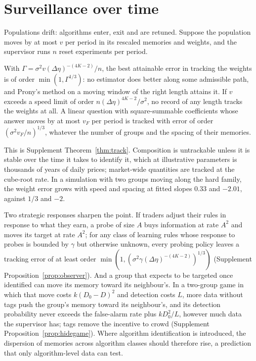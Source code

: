 \section{Surveillance over time}\label{n:dyn}

Populations drift: algorithms enter, exit and are retuned. Suppose the population moves by at most $v$ per period in its rescaled memories and weights, and the supervisor runs $n$ reset experiments per period.

\begin{theorem}\label{n:track}
With $\Gamma=\sigma^2v(\Delta\eta)^{-(4K-2)}/n$, the best attainable error in tracking the weights is of order $\min(1,\Gamma^{1/3})$: no estimator does better along some admissible path, and Prony's method on a moving window of the right length attains it. If $v$ exceeds a speed limit of order $n(\Delta\eta)^{4K-2}/\sigma^2$, no record of any length tracks the weights at all. A linear question with square-summable coefficients whose answer moves by at most $v_F$ per period is tracked with error of order $(\sigma^2v_F/n)^{1/3}$, whatever the number of groups and the spacing of their memories.
\end{theorem}

This is Supplement Theorem~\ref{thm:track}. Composition is untrackable unless it is stable over the time it takes to identify it, which at illustrative parameters is thousands of years of daily prices; market-wide quantities are tracked at the cube-root rate. In a simulation with two groups moving along the hard family, the weight error grows with speed and spacing at fitted slopes $0.33$ and $-2.01$, against $1/3$ and $-2$.

Two strategic responses sharpen the point. If traders adjust their rules in response to what they earn, a probe of size $A$ buys information at rate $A^2$ and moves its target at rate $A^2$; for any class of learning rules whose response to probes is bounded by $\gamma$ but otherwise unknown, every probing policy leaves a tracking error of at least order $\min(1,(\sigma^2\gamma(\Delta\eta)^{-(4K-2)})^{1/3})$ (Supplement Proposition~\ref{prop:observer}). And a group that expects to be targeted once identified can move its memory toward its neighbour's. In a two-group game in which that move costs $k(D_0-D)^2$ and detection costs $L$, more data without tags push the group's memory toward its neighbour's, and its detection probability never exceeds the false-alarm rate plus $kD_0^2/L$, however much data the supervisor has; tags remove the incentive to crowd (Supplement Proposition~\ref{prop:hidegame}). Where algorithm identification is introduced, the dispersion of memories across algorithm classes should therefore rise, a prediction that only algorithm-level data can test.


